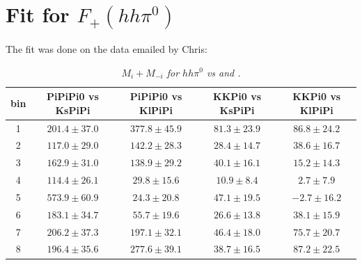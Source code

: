 \chapter{Fit for $F_{+}(hh\pi^0)$}

The fit was done on the data emailed by Chris:
\begin{table}[!h]
	\begin{center}
		\begin{tabular}{c| c|c|c|c}
			bin & PiPiPi0 vs KsPiPi & PiPiPi0 vs KlPiPi & KKPi0 vs KsPiPi & KKPi0 vs KlPiPi  \\
			\hline
			\hline
1 & $201.4 \pm 37.0$ & $377.8 \pm 45.9$ & $81.3 \pm 23.9$ & $86.8 \pm 24.2$ \\
2 & $117.0 \pm 29.0$ & $142.2 \pm 28.3$ & $28.4 \pm 14.7$ & $38.6 \pm 16.7$ \\
3 & $162.9 \pm 31.0$ & $138.9 \pm 29.2$ & $40.1 \pm 16.1$ & $15.2 \pm 14.3$ \\
4 & $114.4 \pm 26.1$ & $29.8 \pm 15.6$ & $10.9 \pm 8.4$ & $2.7 \pm 7.9$ \\
5 & $573.9 \pm 60.9$ & $24.3 \pm 20.8$ & $47.1 \pm 19.5$ & $-2.7 \pm 16.2$ \\
6 & $183.1 \pm 34.7$ & $55.7 \pm 19.6$ & $26.6 \pm 13.8$ & $38.1 \pm 15.9$ \\
7 & $206.2 \pm 37.3$ & $197.1 \pm 32.1$ & $46.4 \pm 18.0$ & $75.7 \pm 20.7$ \\
8 & $196.4 \pm 35.6$ & $277.6 \pm 39.1$ & $38.7 \pm 16.5$ & $87.2 \pm 22.5$ \\ 
\end{tabular}
\end{center}
\caption{\textit{$M_i + M_{-i}$ for $hh\pi^0$ vs \KsPiPi and \KlPiPi.}}
\end{table}


